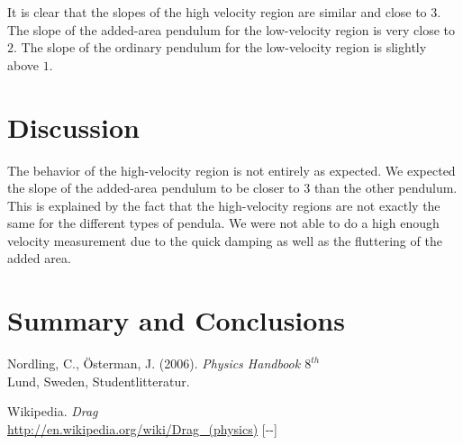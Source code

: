 \documentclass[11pt, a4paper]{article}
\newcommand{\todayswe}{\the\year-\twodigit\month-\twodigit\day}
\begin{document}
It is clear that the slopes of the high velocity region are similar and close to $3$. 
The slope of the added-area pendulum for the low-velocity region is very close to $2$.
The slope of the ordinary pendulum for the low-velocity region is slightly above $1$.



\section{Discussion}
The behavior of the high-velocity region is not entirely as expected. We expected the slope of the added-area pendulum 
to be closer to $3$ than the other pendulum.
This is explained by the fact that the high-velocity regions are not exactly the same for the different types of pendula. We were not 
able to do a high enough velocity measurement due to the quick damping as well as the fluttering of the added area.
\section{Summary and Conclusions}
\vfill

\begin{thebibliography}{99}
	 Nordling, C., Österman, J. (2006). 
  \textit{Physics Handbook  $8^{th}$}\\
  Lund, Sweden, Studentlitteratur.

   Wikipedia. \textit{Drag}\\ 
  \url{http://en.wikipedia.org/wiki/Drag_(physics)} [\todayswe]

\end{thebibliography}

\begin{appendix}
\end{appendix}

\end{document}
